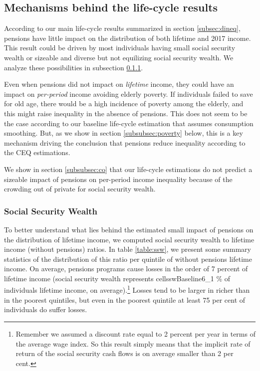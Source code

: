\documentclass{article}
\newcommand{\cellsswBaseline}[2]{%
  \csname cellsswBaseline#1_#2\endcsname
}
\begin{document}
\subsection{Mechanisms behind the life-cycle results} \label{subsec:mechanisms}

According to our main life-cycle results summarized in section \ref{subsec:dineq}, pensions have little impact on the distribution of both lifetime and 2017 income. This result could be driven by most individuals having small social security wealth or sizeable and diverse but not equilizing social security wealth. We analyze these possibilities in subsection \ref{subsubsec:ssw}. 

Even when pensions did not impact on \textit{lifetime} income, they could have an impact on \textit{per-period} income avoiding elderly poverty. If individuals failed to save for old age, there would be a high incidence of poverty among the elderly, and this might raise inequality in the absence of pensions. This does not seem to be the case according to our baseline life-cycle estimation that assumes consumption smoothing. But, as we show in section \ref{subsubsec:poverty} below, this is a key mechanism driving the conclusion that pensions reduce inequality according to the CEQ estimations. 

We show in section \ref{subsubsec:co} that our  life-cycle estimations do not predict a sizeable impact of pensions on per-period income inequality because of the crowding out of private for social security wealth.   

\subsubsection{Social Security Wealth} \label{subsubsec:ssw}

To better understand what lies behind the estimated small impact of pensions on the distribution of lifetime income, we computed social security wealth to lifetime income (without pensions) ratios. In table \ref{table:ssw}, we present some summary statistics of the distribution of this ratio per quintile of without pensions lifetime income. On average, pensions programs cause losses in the order of 7 percent of lifetime income (social security wealth represents \cellsswBaseline{6}{1}\% of individuals lifetime income, on average).\footnote{Remember we assumed a discount rate equal to 2 percent per year in terms of the average wage index. So this result simply means that the implicit rate of return of the social security cash flows is on average smaller than 2 per cent. } Losses tend to be larger in richer than in the poorest quintiles, but even in the poorest quintile at least 75 per cent of individuals do suffer losses.  
\end{document}
